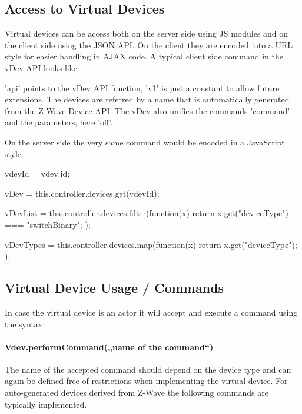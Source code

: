 
\subsection{Access to Virtual Devices}

Virtual devices can be access both on the server side using JS modules and on the client 
side using the JSON API. On the client they are encoded into a URL style for easier 
handling  in AJAX code. A typical client side command in the vDev API looks like


'api' points to the vDev API function, 'v1' is just a constant to allow future extensions. 
The devices are referred by a name that is automatically generated from the Z-Wave 
Device API. The vDev also unifies the commands 'command' and the parameters, here 'off'.

On the server side the very same command would be encoded in a JavaScript style.

\begin{listingverbatim}

vdevId = vdev.id;

vDev = this.controller.devices.get(vdevId);

vDevList = this.controller.devices.filter(function(x) { 
	return x.get("deviceType") === "switchBinary"; }); 

vDevTypes = this.controller.devices.map(function(x) { 
	return x.get("deviceType"); }); 
\end{listingverbatim}

\subsection{Virtual Device Usage / Commands}

In case the virtual device is an actor it will accept and execute a command using the 
syntax:

\paragraph{Vdev.performCommand(„name of the command“)}

The name of the accepted command should depend on the device type and can again be defined 
free of restrictions when implementing the virtual device. For auto-generated devices 
derived from Z-Wave the following commands are typically implemented.


